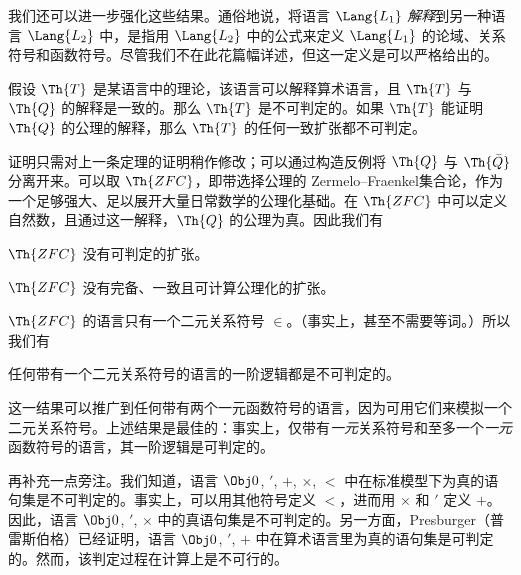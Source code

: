 \documentclass[../../../include/open-logic-section]{subfiles}
\begin{document}


我们还可以进一步强化这些结果。通俗地说，将语言 $\Lang{L_1}$ \emph{解释}到另一种语言 $\Lang{L_2}$ 中，是指用 $\Lang{L_2}$ 中的公式来定义 $\Lang{L_1}$ 的论域、关系符号和函数符号。尽管我们不在此花篇幅详述，但这一定义是可以严格给出的。

\begin{thm}
  假设 $\Th{T}$ 是某语言中的理论，该语言可以解释算术语言，且 $\Th{T}$ 与 $\Th{Q}$ 的解释是一致的。那么 $\Th{T}$ 是不可判定的。如果 $\Th{T}$ 能证明 $\Th{Q}$ 的公理的解释，那么 $\Th{T}$ 的任何一致扩张都不可判定。
\end{thm}

证明只需对上一条定理的证明稍作修改；可以通过构造反例将 $\Th{Q}$ 与 $\Th{\bar Q}$ 分离开来。可以取 $\Th{ZFC}$，即带选择公理的 Zermelo--Fraenkel集合论，作为一个足够强大、足以展开大量日常数学的公理化基础。在 $\Th{ZFC}$ 中可以定义自然数，且通过这一解释，$\Th{Q}$ 的公理为真。因此我们有

\begin{cor}
$\Th{ZFC}$ 没有可判定的扩张。
\end{cor}

\begin{cor}
$\Th{ZFC}$ 没有完备、一致且可计算公理化的扩张。
\end{cor}

$\Th{ZFC}$ 的语言只有一个二元关系符号 $\in$。（事实上，甚至不需要等词。）所以我们有

\begin{cor}
任何带有一个二元关系符号的语言的一阶逻辑都是不可判定的。
\end{cor}

这一结果可以推广到任何带有两个一元函数符号的语言，因为可用它们来模拟一个二元关系符号。上述结果是最佳的：事实上，仅带有\emph{一元}关系符号和至多一个\emph{一元}函数符号的语言，其一阶逻辑是可判定的。

再补充一点旁注。我们知道，语言 $\Obj 0$, $'$, $+$, $\times$, $<$ 中在标准模型下为真的语句集是不可判定的。事实上，可以用其他符号定义 $<$，进而用 $\times$ 和 $'$ 定义 $+$。因此，语言 $\Obj 0$, $'$, $\times$ 中的真语句集是不可判定的。另一方面，Presburger（普雷斯伯格）已经证明，语言 $\Obj 0$, $'$, $+$ 中在算术语言里为真的语句集是可判定的。然而，该判定过程在计算上是不可行的。
\end{document}
